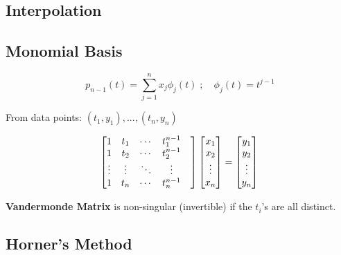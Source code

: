 \documentclass[9pt]{article}
\begin{document}
\footnotesize

\begin{multicols}{3}

\setcounter{section}{6}
\section{Interpolation}

\subsection*{Monomial Basis}

\[
    p_{n-1}(t) = \sum_{j=1}^n x_j \phi_j(t) \; ; \quad  \phi_j(t) = t^{j-1}
\]

From data points: $(t_1, y_1), ..., (t_n, y_n)$

\[
\begin{bmatrix}
1 & t_1  & \cdots & t_1^{n-1} \\
1 & t_2  & \cdots & t_2^{n-1} \\
\vdots & \vdots & \ddots & \vdots & \\
1 & t_n  & \cdots & t_n^{n-1} \\
\end{bmatrix}
\begin{bmatrix}
    x_1\\
    x_2\\
    \vdots\\
    x_n
\end{bmatrix}
=
\begin{bmatrix}
    y_1\\
    y_2\\
    \vdots\\
    y_n
\end{bmatrix}\\
\]

\textbf{Vandermonde Matrix} is non-singular (invertible) if the $t_i$'s are all distinct.

\vspace{0.5cm}
\hdashrule{\linewidth}{0.5pt}{1mm 1mm}

\subsection*{Horner's Method}


\end{multicols}
\end{document}
